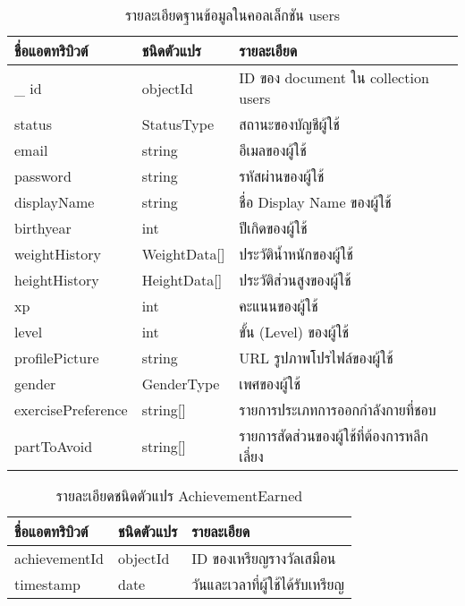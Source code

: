 \begin{table}
    \caption{รายละเอียดฐานข้อมูลในคอลเล็กชัน users}
    \begin{tabularx}{\textwidth}{ | l | l | X | }
        \hline
        \bf ชื่อแอตทริบิวต์ & \bf ชนิดตัวแปร & \bf รายละเอียด \\\hline
        \_ id & objectId & ID ของ document ใน collection users\\\hline
        status & StatusType & สถานะของบัญชีผู้ใช้\\\hline
        email & string & อีเมลของผู้ใช้\\\hline
        password & string & รหัสผ่านของผู้ใช้\\\hline
        displayName & string & ชื่อ Display Name ของผู้ใช้\\\hline
        birthyear & int & ปีเกิดของผู้ใช้\\\hline
        weightHistory & WeightData[] & ประวัติน้ำหนักของผู้ใช้\\\hline
        heightHistory & HeightData[] & ประวัติส่วนสูงของผู้ใช้\\\hline
        xp & int & คะแนนของผู้ใช้\\\hline
        level & int & ขั้น (Level) ของผู้ใช้\\\hline
        profilePicture & string & URL รูปภาพโปรไฟล์ของผู้ใช้\\\hline
        gender & GenderType & เพศของผู้ใช้\\\hline
        exercisePreference & string[] & รายการประเภทการออกกำลังกายที่ชอบ\\\hline
        partToAvoid & string[] & รายการสัดส่วนของผู้ใช้ที่ต้องการหลีกเลี่ยง\\\hline
    \end{tabularx}
\end{table}

\begin{table}
    \caption{รายละเอียดชนิดตัวแปร AchievementEarned}
    \begin{tabularx}{\textwidth}{ | l | l | X | }
        \hline
        \bf ชื่อแอตทริบิวต์ & \bf ชนิดตัวแปร & \bf รายละเอียด \\\hline
        achievementId & objectId & ID ของเหรียญรางวัลเสมือน\\\hline
        timestamp & date & วันและเวลาที่ผู้ใช้ได้รับเหรียญ\\\hline 
    \end{tabularx}
\end{table}


